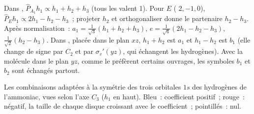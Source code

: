\begin{example}\label{ex:b3:group-theory-applied:salcs}
Dans , $\hat P_{A_1}h_1 \propto h_1 + h_2 + h_3$ (tous les
 valent 1). Pour $E$
( $2, -1, 0$), $\hat P_Eh_1 \propto 2h_1 - h_2 - h_3$~; projeter
$h_2$ et orthogonaliser donne le partenaire $h_2 - h_3$. Après
normalisation~: $a_1 =
\frac{1}{\sqrt3}(h_1 + h_2 + h_3)$, $e = \frac{1}{\sqrt6}(2h_1 - h_2 - h_3)$,
$\frac{1}{\sqrt2}(h_2 - h_3)$. Dans , placée dans le plan $xz$,
$h_1 + h_2$ est
$a_1$ et $h_1 - h_2$ est $b_1$ (elle change de signe par $C_2$ et par
$\sigma_v'(yz)$, qui échangent les hydrogènes). Avec la molécule dans le
plan $yz$, comme le préfèrent certains ouvrages, les symboles $b_1$ et
$b_2$ sont échangés partout.
\end{example}

\begin{omfigure}

{\small Les combinaisons adaptées à la symétrie des trois orbitales $1s$
des hydrogènes de l'ammoniac, vues selon l'axe $C_3$ ($h_1$ en haut).
Bleu~: coefficient positif~; rouge~: négatif, la taille de chaque disque
croissant avec le coefficient~; pointillés~: nul.}
\end{omfigure}

